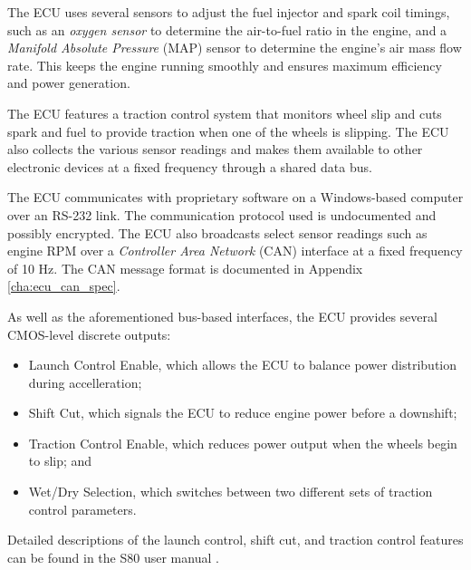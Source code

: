 The ECU uses several sensors to adjust the fuel injector and spark coil timings, such as an \emph{oxygen sensor} to determine the air-to-fuel ratio in the engine, and a \emph{Manifold Absolute Pressure} (MAP) sensor to determine the engine's air mass flow rate. This keeps the engine running smoothly and ensures maximum efficiency and power generation. 

The ECU features a traction control system that monitors wheel slip and cuts spark and fuel to provide traction when one of the wheels is slipping. The ECU also collects the various sensor readings and makes them available to other electronic devices at a fixed frequency through a shared data bus. 


The ECU communicates with proprietary software on a Windows-based computer over an RS-232 link. The communication protocol used is undocumented and possibly encrypted. The ECU also broadcasts select sensor readings such as engine RPM over a \emph{Controller Area Network} (CAN) interface at a fixed frequency of 10 Hz. The CAN message format is documented in Appendix \ref{cha:ecu_can_spec}.

As well as the aforementioned bus-based interfaces, the ECU provides several CMOS-level discrete outputs:

\begin{itemize}
	\item Launch Control Enable, which allows the ECU to balance power distribution during accelleration;
    \item Shift Cut, which signals the ECU to reduce engine power before a downshift;
    \item Traction Control Enable, which reduces power output when the wheels begin to slip; and
    \item Wet/Dry Selection, which switches between two different sets of traction control parameters.
\end{itemize}

Detailed descriptions of the launch control, shift cut, and traction control features can be found in the S80 user manual \cite{s80pro}.


